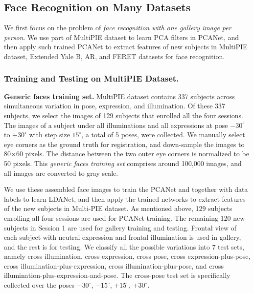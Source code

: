 \documentclass[10pt,journal,compsoc]{IEEEtran}
\begin{document}
\subsection{Face Recognition on Many Datasets}
We first focus on the problem of {\it face recognition with one gallery image per person}. We use part of MultiPIE dataset to learn PCA filters in PCANet, and then apply such trained PCANet to extract features of new subjects in MultiPIE dataset, Extended Yale B, AR, and FERET datasets for face recognition.

\subsubsection{Training and Testing on MultiPIE Dataset.}\label{sec: MultiPIE}
{\bf Generic faces training set.} MultiPIE dataset \cite{Gross2008} contains 337 subjects across simultaneous variation in pose, expression, and illumination. Of these 337 subjects, we select the images of 129 subjects that enrolled all the four sessions. The images of a subject under all illuminations and all expressions at pose $-30^\circ$ to $+30^\circ$ with step size $15^\circ$, a total of 5 poses, were collected. We manually select eye corners as the ground truth for registration, and down-sample the images to 80$\times$60 pixels. The distance between the two outer eye corners is normalized to be 50 pixels. This {\em generic faces training set} comprises around 100,000 images, and all images are converted to gray scale.

We use these assembled face images to train the PCANet and together with data labels to learn LDANet, and then apply the trained networks to extract features of the new subjects in Multi-PIE dataset. As mentioned above, 129 subjects enrolling all four sessions are used for PCANet training. The remaining 120 new subjects in Session 1 are used for gallery training and testing. Frontal view of each subject with neutral expression and frontal illumination is used in gallery, and the rest is for testing. We classify all the possible variations into 7 test sets, namely cross illumination, cross expression, cross pose, cross expression-plus-pose, cross illumination-plus-expression, cross illumination-plus-pose, and cross illumination-plus-expression-and-pose. The cross-pose test set is specifically collected over the poses $-30^\circ$, $-15^\circ$, $+15^\circ$, $+30^\circ$.
\end{document}
